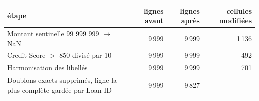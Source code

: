 \begin{tabular}{lrrr}
\toprule
\textbf{étape} & \textbf{lignes avant} & \textbf{lignes après} & \textbf{cellules modifiées} \\
\midrule
Montant sentinelle 99 999 999 $\rightarrow$ NaN & 9\,999 & 9\,999 & 1\,136 \\
Credit Score $>$ 850 divisé par 10 & 9\,999 & 9\,999 & 492 \\
Harmonisation des libellés & 9\,999 & 9\,999 & 701 \\
Doublons exacts supprimés, ligne la plus complète gardée par Loan ID & 9\,999 & 9\,827 &  \\
\bottomrule
\end{tabular}
